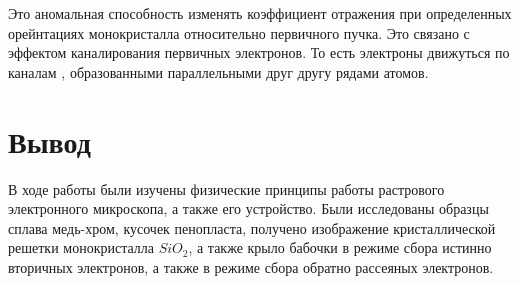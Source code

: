 \documentclass[a4paper]{article}
\begin{document}
\begin{enumerate}
    Это аномальная способность изменять коэффициент отражения при определенных орейнтациях монокристалла относительно первичного пучка. 
    Это связано с эффектом каналирования первичных электронов. То есть электроны движуться по каналам , образованными параллельными друг другу рядами атомов.

\end{enumerate}

\section{Вывод}

В ходе работы были изучены физические принципы работы растрового электронного микроскопа, а также его устройство. Были исследованы образцы сплава медь-хром, 
кусочек пенопласта, получено изображение кристаллической решетки монокристалла $SiO_2$, а также крыло бабочки в режиме сбора истинно вторичных электронов, а также в режиме сбора обратно рассеяных электронов.
\end{document}

